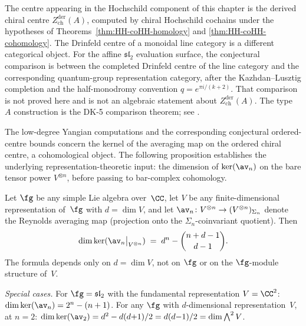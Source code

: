 \begin{remark}
\label{rem:drinfeld-centre-qg}
The centre appearing in the Hochschild component of this chapter is the
derived chiral centre
$Z^{\mathrm{der}}_{\mathrm{ch}}(A)$, computed by chiral Hochschild
cochains under the hypotheses of
Theorems~\ref{thm:HH-coHH-homology} and
\ref{thm:HH-coHH-cohomology}. The Drinfeld centre of a monoidal line
category is a different categorical object. For the affine
$\mathfrak{sl}_2$ evaluation surface, the conjectural comparison is
between the completed Drinfeld centre of the line category and the
corresponding quantum-group representation category, after the
Kazhdan--Lusztig completion and the half-monodromy convention
$q=e^{\pi i/(k+2)}$. That comparison is not proved here and is
not an algebraic statement about
$Z^{\mathrm{der}}_{\mathrm{ch}}(A)$. The type~$A$ construction is the
DK-5 comparison theorem; see \cite[\S6]{Lorgat26I}.
\end{remark}

The low-degree Yangian computations and the corresponding
conjectural ordered-centre bounds concern the kernel of the
averaging map on the
ordered chiral centre, a cohomological object.
The following proposition establishes the underlying
representation-theoretic input: the dimension of
$\ker(\av_n)$ on the bare tensor power $V^{\otimes n}$,
before passing to bar-complex cohomology.

\begin{proposition}
\label{prop:ker-av-schur-weyl}
\ClaimStatusProvedHere
Let $\fg$ be any simple Lie algebra over~$\CC$, let
$V$ be any finite-dimensional representation of~$\fg$ with
$d = \dim V$, and let
$\av_n \colon V^{\otimes n} \to (V^{\otimes n})_{\Sigma_n}$
denote the Reynolds averaging map (projection onto the
$\Sigma_n$-coinvariant quotient).
Then
\begin{equation}\label{eq:ker-av-schur-weyl}
 \dim \ker(\av_n\big|_{V^{\otimes n}})
 \;=\;
 d^n - \binom{n+d-1}{d-1}.
\end{equation}
The formula depends only on $d = \dim V$, not on $\fg$ or
on the $\fg$-module structure of~$V$.

\smallskip
\noindent\textit{Special cases.}
For $\fg = \mathfrak{sl}_2$ with the fundamental
representation $V = \CC^2$:
$\dim\ker(\av_n) = 2^n - (n+1)$.
For any $\fg$ with $d$-dimensional representation~$V$,
at $n = 2$:
$\dim\ker(\av_2) = d^2 - d(d{+}1)/2 = d(d{-}1)/2
= \dim\bigwedge^2 V$.
\end{proposition}

